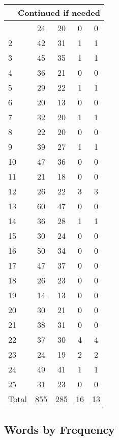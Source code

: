 \begin{center}
\begin{longtable}{l|c|c|c|c}
\hline \multicolumn{5}{|r|}{{Continued if needed}} \\ \hline
\endfoot 
1 & 24 & 20 & 0 & 0\\ \hline
2 & 42 & 31 & 1 & 1\\ \hline
3 & 45 & 35 & 1 & 1\\ \hline
4 & 36 & 21 & 0 & 0\\ \hline
5 & 29 & 22 & 1 & 1\\ \hline
6 & 20 & 13 & 0 & 0\\ \hline
7 & 32 & 20 & 1 & 1\\ \hline
8 & 22 & 20 & 0 & 0\\ \hline
9 & 39 & 27 & 1 & 1\\ \hline
10 & 47 & 36 & 0 & 0\\ \hline
11 & 21 & 18 & 0 & 0\\ \hline
12 & 26 & 22 & 3 & 3\\ \hline
13 & 60 & 47 & 0 & 0\\ \hline
14 & 36 & 28 & 1 & 1\\ \hline
15 & 30 & 24 & 0 & 0\\ \hline
16 & 50 & 34 & 0 & 0\\ \hline
17 & 47 & 37 & 0 & 0\\ \hline
18 & 26 & 23 & 0 & 0\\ \hline
19 & 14 & 13 & 0 & 0\\ \hline
20 & 30 & 21 & 0 & 0\\ \hline
21 & 38 & 31 & 0 & 0\\ \hline
22 & 37 & 30 & 4 & 4\\ \hline
23 & 24 & 19 & 2 & 2\\ \hline
24 & 49 & 41 & 1 & 1\\ \hline
25 & 31 & 23 & 0 & 0\\ \hline
\hline \hline
Total & 855 & 285 & 16 & 13



\end{longtable}
\end{center}

 
\subsection{Words by Frequency}

